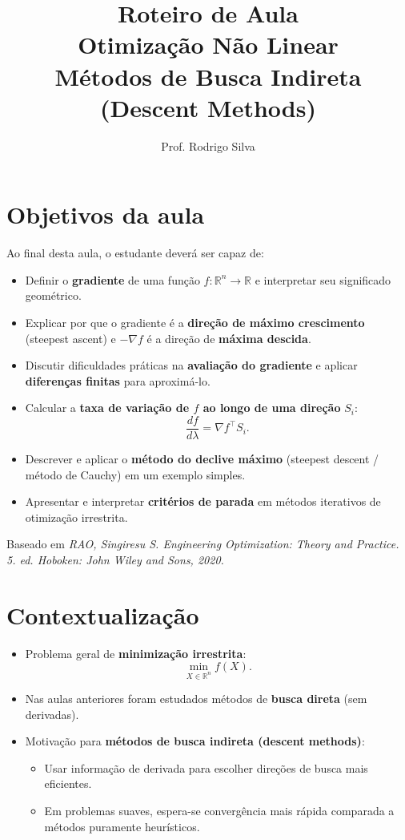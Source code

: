 \documentclass[9pt,a4paper]{extarticle}
\title{\vspace{-1cm}Roteiro de Aula\\Otimização Não Linear\\Métodos de Busca Indireta (Descent Methods)}
\author{Prof. Rodrigo Silva}
\date{}
\begin{document}
\maketitle

\section*{Objetivos da aula}

Ao final desta aula, o estudante deverá ser capaz de:
\begin{itemize}
    \item Definir o \textbf{gradiente} de uma função $f:\mathbb{R}^n \to \mathbb{R}$ e interpretar seu significado geométrico.
    \item Explicar por que o gradiente é a \textbf{direção de máximo crescimento} (steepest ascent) e $-\nabla f$ é a direção de \textbf{máxima descida}.
    \item Discutir dificuldades práticas na \textbf{avaliação do gradiente} e aplicar \textbf{diferenças finitas} para aproximá-lo.
    \item Calcular a \textbf{taxa de variação de $f$ ao longo de uma direção} $S_i$:
    \[
      \frac{df}{d\lambda} = \nabla f^\top S_i.
    \]
    \item Descrever e aplicar o \textbf{método do declive máximo} (steepest descent / método de Cauchy) em um exemplo simples.
    \item Apresentar e interpretar \textbf{critérios de parada} em métodos iterativos de otimização irrestrita.
\end{itemize}

Baseado em \textit{RAO, Singiresu S. Engineering Optimization: Theory and Practice. 5. ed. Hoboken: John Wiley and Sons, 2020.}

\section{Contextualização}

\begin{itemize}
    \item Problema geral de \textbf{minimização irrestrita}:
    \[
      \min_{X \in \mathbb{R}^n} f(X).
    \]
    \item Nas aulas anteriores foram estudados métodos de \textbf{busca direta} (sem derivadas).
    \item Motivação para \textbf{métodos de busca indireta (descent methods)}:
    \begin{itemize}
        \item Usar informação de derivada para escolher direções de busca mais eficientes.
        \item Em problemas suaves, espera-se convergência mais rápida comparada a métodos puramente heurísticos.
    \end{itemize}
\end{itemize}
\end{document}

